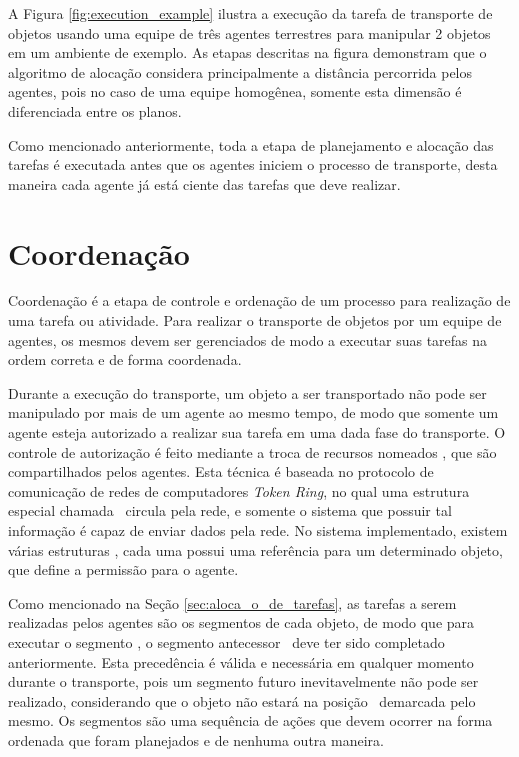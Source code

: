 A Figura \ref{fig:execution_example} ilustra a execução da tarefa de transporte de objetos usando uma equipe de três agentes terrestres para manipular 2 objetos em um ambiente de exemplo. As etapas descritas na figura demonstram que o algoritmo de alocação considera principalmente a distância percorrida pelos agentes, pois no caso de uma equipe homogênea, somente esta dimensão é diferenciada entre os planos.

Como mencionado anteriormente, toda a etapa de planejamento e alocação das tarefas é executada antes que os agentes iniciem o processo de transporte, desta maneira cada agente já está ciente das tarefas que deve realizar.

\section{Coordenação} %
\label{sec:coordena_o}

Coordenação é a etapa de controle e ordenação de um processo para realização de uma tarefa ou atividade.
Para realizar o transporte de objetos por um equipe de agentes, os mesmos devem ser gerenciados de modo a executar suas tarefas na ordem correta e de forma coordenada.

Durante a execução do transporte, um objeto a ser transportado não pode ser manipulado por mais de um agente ao mesmo tempo, de modo que somente um agente esteja autorizado a realizar sua tarefa em uma dada fase do transporte.
O controle de autorização é feito mediante a troca de recursos nomeados \token, que são compartilhados pelos agentes.
Esta técnica é baseada no protocolo de comunicação de redes de computadores \emph{Token Ring}, no qual uma estrutura especial chamada \token\ circula pela rede, e somente o sistema que possuir tal informação é capaz de enviar dados pela rede.
No sistema implementado, existem várias estruturas \token, cada uma possui uma referência para um determinado objeto, que define a permissão para o agente.

Como mencionado na Seção \ref{sec:aloca_o_de_tarefas}, as tarefas a serem realizadas pelos agentes são os segmentos de cada objeto, de modo que para executar o segmento , o segmento antecessor \ deve ter sido completado anteriormente.
Esta precedência é válida e necessária em qualquer momento durante o transporte, pois um segmento futuro inevitavelmente não pode ser realizado, considerando que o objeto não estará na posição \originstate\ demarcada pelo mesmo.
Os segmentos são uma sequência de ações que devem ocorrer na forma ordenada que foram planejados e de nenhuma outra maneira.

